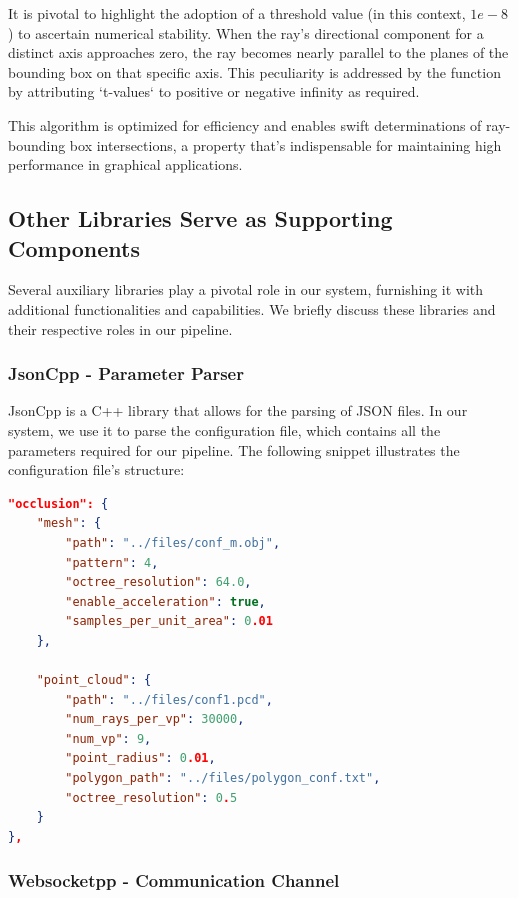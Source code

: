 \documentclass[11pt, a4paper,oneside,chapterprefix=false]{scrbook}
\begin{document}
It is pivotal to highlight the adoption of a threshold value (in this context, \(1e-8\)) to ascertain numerical stability. When the ray's directional component for a distinct axis approaches zero, the ray becomes nearly parallel to the planes of the bounding box on that specific axis. This peculiarity is addressed by the function by attributing `t-values` to positive or negative infinity as required.

This algorithm is optimized for efficiency and enables swift determinations of ray-bounding box intersections, a property that's indispensable for maintaining high performance in graphical applications.


\subsection{Other Libraries Serve as Supporting Components} \label{sec:supporting libraries}

Several auxiliary libraries play a pivotal role in our system, furnishing it with additional functionalities and capabilities. We briefly discuss these libraries and their respective roles in our pipeline.

\subsubsection{JsonCpp - Parameter Parser} \label{subsec:jsoncpp}

JsonCpp is a C++ library that allows for the parsing of JSON files. In our system, we use it to parse the configuration file, which contains all the parameters required for our pipeline. The following snippet illustrates the configuration file's structure:

\begin{lstlisting}[language=json, caption=Json Configuration File]
"occlusion": {
	"mesh": {
		"path": "../files/conf_m.obj",
		"pattern": 4,
		"octree_resolution": 64.0,
		"enable_acceleration": true,
		"samples_per_unit_area": 0.01
	},

	"point_cloud": {
		"path": "../files/conf1.pcd",
		"num_rays_per_vp": 30000, 
		"num_vp": 9, 
		"point_radius": 0.01,
		"polygon_path": "../files/polygon_conf.txt",
		"octree_resolution": 0.5
	}
},
\end{lstlisting}

\subsubsection{Websocketpp - Communication Channel} \label{subsec:websocketpp}
\end{document}
